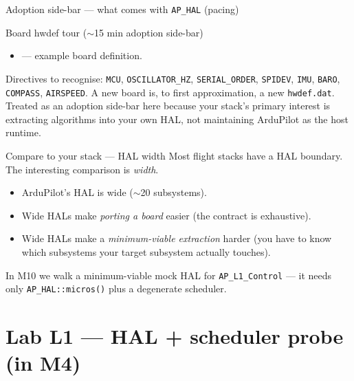 \documentclass[aspectratio=169,11pt]{beamer}
\begin{document}
\ifinstructor
\begin{frame}[allowframebreaks]{Adoption side-bar --- what comes with \texttt{AP\_HAL} (pacing)}
\end{frame}
\fi

\begin{frame}[allowframebreaks]{Board hwdef tour ($\sim$15 min adoption side-bar)}
  \begin{itemize}
    \item {} --- example board definition.
  \end{itemize}
  \vfill
  Directives to recognise: \texttt{MCU}, \texttt{OSCILLATOR\_HZ}, \texttt{SERIAL\_ORDER}, \texttt{SPIDEV}, \texttt{IMU}, \texttt{BARO}, \texttt{COMPASS}, \texttt{AIRSPEED}.
  \vfill
  A new board is, to first approximation, a new \texttt{hwdef.dat}. Treated as an adoption side-bar here because your stack's primary interest is extracting algorithms into your own HAL, not maintaining ArduPilot as the host runtime.
\end{frame}

\begin{frame}{Compare to your stack --- HAL width}
  Most flight stacks have a HAL boundary. The interesting comparison is \emph{width}.
  \vfill
  \begin{itemize}
    \item ArduPilot's HAL is wide ($\sim$20 subsystems).
    \item Wide HALs make \emph{porting a board} easier (the contract is exhaustive).
    \item Wide HALs make a \emph{minimum-viable extraction} harder (you have to know which subsystems your target subsystem actually touches).
  \end{itemize}
  \vfill
  In M10 we walk a minimum-viable mock HAL for \texttt{AP\_L1\_Control} --- it needs only \texttt{AP\_HAL::micros()} plus a degenerate scheduler.
\end{frame}

\section{Lab L1 --- HAL + scheduler probe (in M4)}
\end{document}
